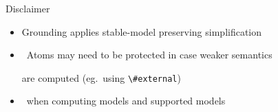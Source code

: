 \begin{frame}{Disclaimer}
  \bigskip
  \begin{itemize}
  \item Grounding applies stable-model preserving simplification
  \item [] \itarrow\ Atoms may need to be protected in case weaker semantics
    \par\phantom{\itarrow}
    are computed
    (eg.\ using \lstinline{\#external})
    \medskip
  \item {} \ when computing models and supported models
  \end{itemize}
\end{frame}
%
